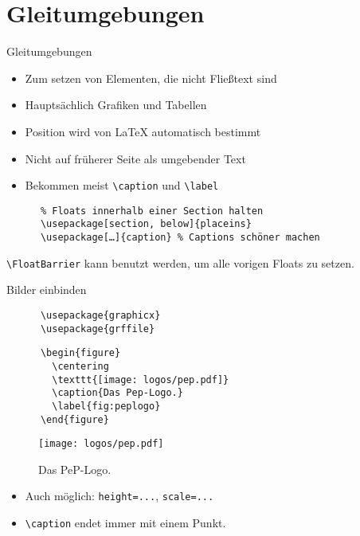 \section{Gleitumgebungen}
\begin{frame}[fragile]{
  Gleitumgebungen
  \hfill
}
  \begin{itemize}
    \item Zum setzen von Elementen, die nicht Fließtext sind
    \item Hauptsächlich Grafiken und Tabellen
    \item Position wird von \LaTeX{} automatisch bestimmt
    \item Nicht auf früherer Seite als umgebender Text
    \item Bekommen meist \lstinline+\caption+ und \lstinline+\label+
  \end{itemize}
  \begin{Packages}
    \begin{lstlisting}
      % Floats innerhalb einer Section halten
      \usepackage[section, below]{placeins}
      \usepackage[…]{caption} % Captions schöner machen
    \end{lstlisting}
  \end{Packages}

  \lstinline+\FloatBarrier+ kann benutzt werden, um alle vorigen Floats zu setzen.
\end{frame}

\begin{frame}[fragile]{
  Bilder einbinden
  \hfill
}
  \begin{Packages}
    \begin{lstlisting}
      \usepackage{graphicx}
      \usepackage{grffile}
    \end{lstlisting}
  \end{Packages}
  \begin{CodeExample}{0.65}
    \begin{lstlisting}
      \begin{figure}
        \centering
        \texttt{[image: logos/pep.pdf]}
        \caption{Das Pep-Logo.}
        \label{fig:peplogo}
      \end{figure}
    \end{lstlisting}
  \CodeResult
    \begin{figure}
      \centering
      \texttt{[image: logos/pep.pdf]}
      \caption{Das PeP-Logo.}
      \label{fig:peplogo}
    \end{figure}
  \end{CodeExample}
  \vspace{5pt}
  \begin{itemize}
    \item Auch möglich: \lstinline+height=...+, \lstinline+scale=...+
    \item \lstinline+\caption+ endet immer mit einem Punkt.
  \end{itemize}
\end{frame}

